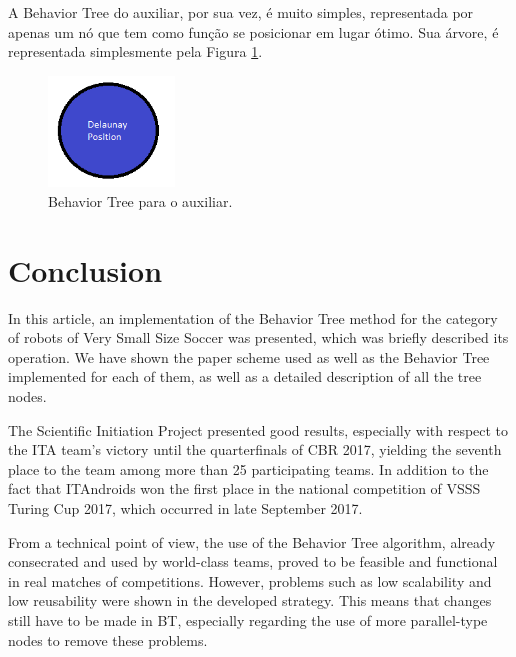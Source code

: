 \documentclass[conference]{IEEEtran}
\begin{document}
	A Behavior Tree do auxiliar, por sua vez, é muito simples, representada por apenas um nó que tem como função se posicionar em lugar ótimo. Sua árvore, é representada simplesmente pela Figura \ref{fig:auxiliar_bt}.

\begin{figure}[H]
	\centering
	\includegraphics[width=0.3\textwidth]{figures/Auxiliar_BT.png}
   \caption{Behavior Tree para o auxiliar.} \label{fig:auxiliar_bt}
\end{figure}


\section{Conclusion}
	In this article, an implementation of the Behavior Tree method for the category of robots of Very Small Size Soccer was presented, which was briefly described its operation. We have shown the paper scheme used as well as the Behavior Tree implemented for each of them, as well as a detailed description of all the tree nodes.

The Scientific Initiation Project presented good results, especially with respect to the ITA team's victory until the quarterfinals of CBR 2017, yielding the seventh place to the team among more than 25 participating teams. In addition to the fact that ITAndroids won the first place in the national competition of VSSS Turing Cup 2017, which occurred in late September 2017.

From a technical point of view, the use of the Behavior Tree algorithm, already consecrated and used by world-class teams, proved to be feasible and functional in real matches of competitions. However, problems such as low scalability and low reusability were shown in the developed strategy. This means that changes still have to be made in BT, especially regarding the use of more parallel-type nodes to remove these problems.
\end{document}
